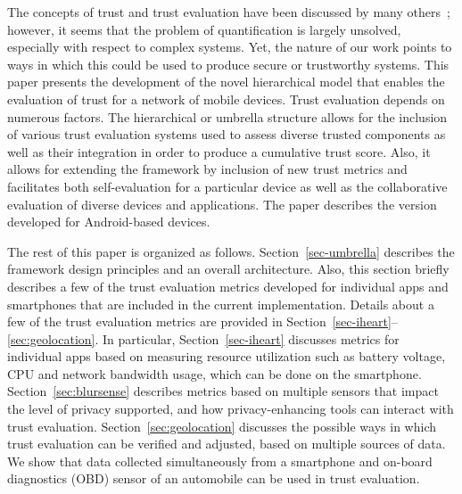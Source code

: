 The concepts of trust and trust evaluation have been discussed by many others~\cite{jing2014riskmon,shabtai2010google,zheng2014droidray}; 
however, it seems that the problem  of quantification is largely unsolved, especially with respect to complex systems.
 Yet, the nature of our work points to ways in which 
this could be used to produce secure or trustworthy systems.  
This paper presents the development of the novel hierarchical model that enables the  evaluation of trust for a 
network of mobile devices. Trust evaluation depends on numerous factors. The hierarchical or umbrella structure allows for the
inclusion of various trust evaluation systems used to assess diverse trusted components as well as their integration 
in order to produce a cumulative trust score. Also, it allows for extending the framework by inclusion of new trust 
metrics and facilitates both self-evaluation for a particular device as well as the collaborative evaluation of 
diverse devices and applications. 
The paper describes the version developed for Android-based devices.

The rest of this paper is organized as follows. 
Section~\ref{sec-umbrella} describes the framework design principles and an overall architecture. Also, this section 
 briefly describes a few of the trust evaluation metrics developed for individual apps and
smartphones that are included in the current implementation.
Details about a few of the trust evaluation metrics are provided in Section~\ref{sec-iheart}--\ref{sec:geolocation}. In particular, Section~\ref{sec-iheart} discusses metrics 
for individual apps based on measuring resource utilization such as battery voltage, CPU and network bandwidth usage,
which can be done on the smartphone.
Section~\ref{sec:blursense} describes metrics based on multiple sensors that impact the level of privacy supported, and how 
privacy-enhancing tools can interact with trust evaluation.
Section~\ref{sec:geolocation} discusses the possible ways in which trust evaluation can be verified and adjusted, based on multiple sources
of data. We show that data collected simultaneously from a smartphone and on-board diagnostics (OBD) 
sensor of an automobile can be used in trust evaluation.
